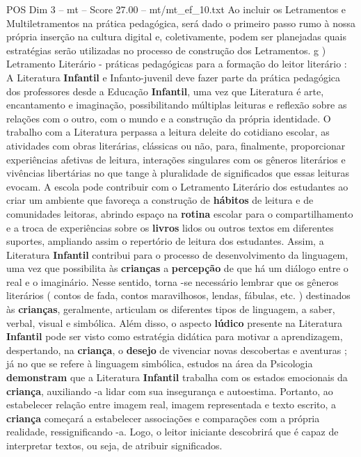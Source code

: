 \begin{textsample}{POS Dim 3 – mt – Score 27.00 – mt/mt\_ef\_10.txt}
Ao incluir os Letramentos e Multiletramentos na prática pedagógica, será dado o primeiro passo rumo à nossa própria inserção na cultura digital e, coletivamente, podem ser planejadas quais estratégias serão utilizadas no processo de construção dos Letramentos. g ) Letramento Literário - práticas pedagógicas para a formação do leitor literário : A Literatura \textbf{Infantil} e Infanto-juvenil deve fazer parte da prática pedagógica dos professores desde a Educação \textbf{Infantil}, uma vez que Literatura é arte, encantamento e imaginação, possibilitando múltiplas leituras e reflexão sobre as relações com o outro, com o mundo e a construção da própria identidade.
O trabalho com a Literatura perpassa a leitura deleite do cotidiano escolar, as atividades com obras literárias, clássicas ou não, para, finalmente, proporcionar experiências afetivas de leitura, interações singulares com os gêneros literários e vivências libertárias no que tange à pluralidade de significados que essas leituras evocam.
A escola pode contribuir com o Letramento Literário dos estudantes ao criar um ambiente que favoreça a construção de \textbf{hábitos} de leitura e de comunidades leitoras, abrindo espaço na \textbf{rotina} escolar para o compartilhamento e a troca de experiências sobre os \textbf{livros} lidos ou outros textos em diferentes suportes, ampliando assim o repertório de leitura dos estudantes.
Assim, a Literatura \textbf{Infantil} contribui para o processo de desenvolvimento da linguagem, uma vez que possibilita às \textbf{crianças} a \textbf{percepção} de que há um diálogo entre o real e o imaginário.
Nesse sentido, torna -se necessário lembrar que os gêneros literários ( contos de fada, contos maravilhosos, lendas, fábulas, etc. ) destinados às \textbf{crianças}, geralmente, articulam os diferentes tipos de linguagem, a saber, verbal, visual e simbólica.
Além disso, o aspecto \textbf{lúdico} presente na Literatura \textbf{Infantil} pode ser visto como estratégia didática para motivar a aprendizagem, despertando, na \textbf{criança}, o \textbf{desejo} de vivenciar novas descobertas e aventuras ; já no que se refere à linguagem simbólica, estudos na área da Psicologia \textbf{demonstram} que a Literatura \textbf{Infantil} trabalha com os estados emocionais da \textbf{criança}, auxiliando -a lidar com sua insegurança e autoestima.
Portanto, ao estabelecer relação entre imagem real, imagem representada e texto escrito, a \textbf{criança} começará a estabelecer associações e comparações com a própria realidade, ressignificando -a.
Logo, o leitor iniciante descobrirá que é capaz de interpretar textos, ou seja, de atribuir significados.

\end{textsample}
